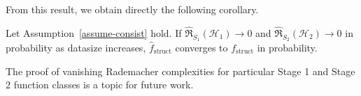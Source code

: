 From this result, we obtain directly the following corollary.

\begin{corollary}
Let Assumption~\ref{assume-consist} hold. If $\hat{\mathfrak{R}}_{S_1}(\mathcal{H}_1) \to 0$ and $\hat{\mathfrak{R}}_{S_2}(\mathcal{H}_2) \to 0$ in probability as datasize increases, $\hat{f}_{\mathrm{struct}}$ converges to ${f}_{\mathrm{struct}}$ in probability.
\end{corollary}

The proof of vanishing Rademacher complexities for particular Stage 1 and Stage 2 function classes is a topic for future work.
